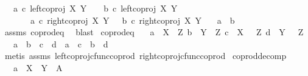 \begin{isabellebody}
\ \ \ {\isachardoublequoteopen}{\isacharparenleft}{\kern0pt}a\ {\isasymcirc}\isactrlsub c\ left{\isacharunderscore}{\kern0pt}coproj\ X\ Y\ \ \ {\isacharequal}{\kern0pt}\ b\ {\isasymcirc}\isactrlsub c\ left{\isacharunderscore}{\kern0pt}coproj\ X\ Y\ \isanewline
\ \ \ \ \ \ {\isasymand}\ a\ {\isasymcirc}\isactrlsub c\ right{\isacharunderscore}{\kern0pt}coproj\ X\ Y\ \ {\isacharequal}{\kern0pt}\ b\ {\isasymcirc}\isactrlsub c\ right{\isacharunderscore}{\kern0pt}coproj\ X\ Y{\isacharparenright}{\kern0pt}{\isachardoublequoteclose}\isanewline
\ \ \ {\isachardoublequoteopen}a\ {\isacharequal}{\kern0pt}\ b{\isachardoublequoteclose}\isanewline
%
\isadelimproof
\ \ %
\endisadelimproof
%
\isatagproof
{}\isamarkupfalse%
\ assms\ coprod{\isacharunderscore}{\kern0pt}eq\ \isamarkupfalse%
\ blast%
\endisatagproof
{\isafoldproof}%
%
\isadelimproof
\isanewline
%
\endisadelimproof
\isanewline
{}\isamarkupfalse%
\ coprod{\isacharunderscore}{\kern0pt}eq{}{\isacharcolon}{\kern0pt}\isanewline
\ \ \ {\isachardoublequoteopen}a\ {\isacharcolon}{\kern0pt}\ X\ {\isasymrightarrow}\ Z{\isachardoublequoteclose}\ {\isachardoublequoteopen}b\ {\isacharcolon}{\kern0pt}\ Y\ {\isasymrightarrow}\ Z{\isachardoublequoteclose}\ {\isachardoublequoteopen}c\ {\isacharcolon}{\kern0pt}\ X\ {\isasymrightarrow}\ \ Z{\isachardoublequoteclose}\ {\isachardoublequoteopen}d\ {\isacharcolon}{\kern0pt}\ Y\ {\isasymrightarrow}\ \ Z{\isachardoublequoteclose}\isanewline
\ \ \ {\isachardoublequoteopen}{\isacharparenleft}{\kern0pt}a\ {\isasymamalg}\ b{\isacharparenright}{\kern0pt}\ {\isacharequal}{\kern0pt}\ {\isacharparenleft}{\kern0pt}c\ {\isasymamalg}\ d{\isacharparenright}{\kern0pt}\ {\isasymlongleftrightarrow}\ {\isacharparenleft}{\kern0pt}a\ {\isacharequal}{\kern0pt}\ c\ {\isasymand}\ b\ {\isacharequal}{\kern0pt}\ d{\isacharparenright}{\kern0pt}{\isachardoublequoteclose}\isanewline
%
\isadelimproof
\ \ %
\endisadelimproof
%
\isatagproof
{}\isamarkupfalse%
\ {\isacharparenleft}{\kern0pt}metis\ assms\ left{\isacharunderscore}{\kern0pt}coproj{\isacharunderscore}{\kern0pt}cfunc{\isacharunderscore}{\kern0pt}coprod\ right{\isacharunderscore}{\kern0pt}coproj{\isacharunderscore}{\kern0pt}cfunc{\isacharunderscore}{\kern0pt}coprod{\isacharparenright}{\kern0pt}%
\endisatagproof
{\isafoldproof}%
%
\isadelimproof
\isanewline
%
\endisadelimproof
\isanewline
{}\isamarkupfalse%
\ coprod{\isacharunderscore}{\kern0pt}decomp{\isacharcolon}{\kern0pt}\isanewline
\ \ \ {\isachardoublequoteopen}a\ {\isacharcolon}{\kern0pt}\ X\ {\isasymCoprod}\ Y\ {\isasymrightarrow}\ A{\isachardoublequoteclose}\isanewline

\end{isabellebody}
